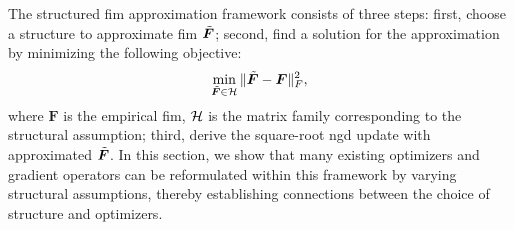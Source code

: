 The structured \gls{fim} approximation framework consists of three steps: first, choose a structure to approximate \gls{fim} $\tilde{\bm{F}}$; second, find a solution for the approximation by minimizing the following objective:
\begin{equation}
    \min_{\tilde{\bm{F}}\in\mathcal{H}} \Vert\tilde{\bm{F}}-\bm{F}\Vert_F^2,
    \label{eq: UFE equation}
\end{equation}
where $\bm{F}$ is the empirical \gls{fim}, $\mathcal{H}$ is the matrix family corresponding to the structural assumption; third, derive the square-root \gls{ngd} update  with approximated $\tilde{\bm{F}}$. In this section, we show that many existing optimizers and gradient operators can be reformulated within this framework by varying structural assumptions, thereby establishing connections between the choice of structure and optimizers.